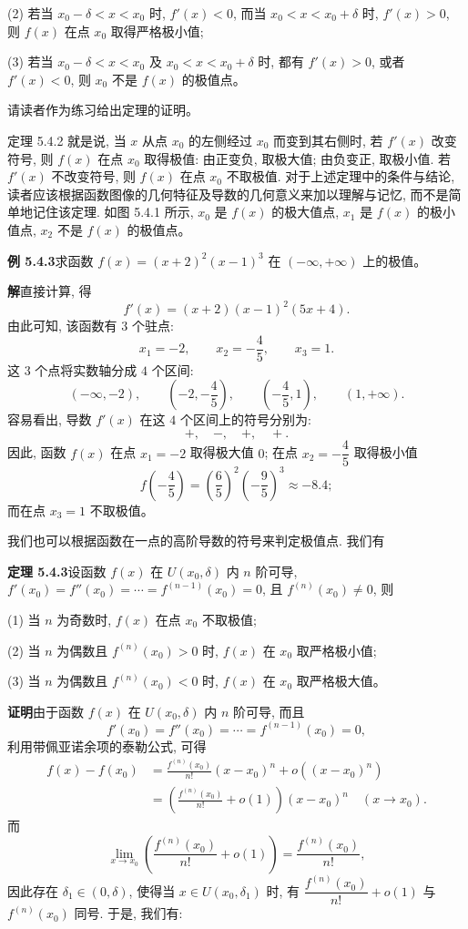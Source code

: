 \documentclass[UTF8, 12pt, fontset=fandol, oneside]{ctexart}
\begin{document}
(2) 若当 $x_0-\delta<x<x_0$ 时, $f'(x)<0$, 而当 $x_0<x<x_0+\delta$ 时, $f'(x)>0$, 则 $f(x)$ 在点 $x_0$ 取得严格极小值;

(3) 若当 $x_0-\delta<x<x_0$ 及 $x_0<x<x_0+\delta$ 时, 都有 $f'(x)>0$, 或者 $f'(x)<0$, 则 $x_0$ 不是 $f(x)$ 的极值点。

请读者作为练习给出定理的证明。

定理 5.4.2 就是说, 当 $x$ 从点 $x_0$ 的左侧经过 $x_0$ 而变到其右侧时, 若 $f'(x)$ 改变符号, 则 $f(x)$ 在点 $x_0$ 取得极值: 由正变负, 取极大值; 由负变正, 取极小值. 若 $f'(x)$ 不改变符号, 则 $f(x)$ 在点 $x_0$ 不取极值. 对于上述定理中的条件与结论, 读者应该根据函数图像的几何特征及导数的几何意义来加以理解与记忆, 而不是简单地记住该定理. 如图 5.4.1 所示, $x_0$ 是 $f(x)$ 的极大值点, $x_1$ 是 $f(x)$ 的极小值点, $x_2$ 不是 $f(x)$ 的极值点。

\noindent\textbf{例 5.4.3}\quad 求函数 $f(x)=(x+2)^2(x-1)^3$ 在 $(-\infty,+\infty)$ 上的极值。

\noindent\textbf{解}\quad 直接计算, 得
\[
  f'(x)=(x+2)(x-1)^2(5x+4).
\]
由此可知, 该函数有 $3$ 个驻点:
\[
  x_1=-2,\qquad x_2=-\frac45,\qquad x_3=1.
\]
这 $3$ 个点将实数轴分成 $4$ 个区间:
\[
  (-\infty,-2),\qquad \left(-2,-\frac45\right),\qquad
  \left(-\frac45,1\right),\qquad (1,+\infty).
\]
容易看出, 导数 $f'(x)$ 在这 $4$ 个区间上的符号分别为:
\[
  +,\quad -,\quad +,\quad +.
\]
因此, 函数 $f(x)$ 在点 $x_1=-2$ 取得极大值 $0$; 在点 $x_2=-\dfrac45$ 取得极小值
\[
  f\left(-\frac45\right)=\left(\frac65\right)^2\left(-\frac95\right)^3\approx -8.4;
\]
而在点 $x_3=1$ 不取极值。

我们也可以根据函数在一点的高阶导数的符号来判定极值点. 我们有

\noindent\textbf{定理 5.4.3}\quad 设函数 $f(x)$ 在 $U(x_0,\delta)$ 内 $n$ 阶可导, $f'(x_0)=f''(x_0)=\cdots=f^{(n-1)}(x_0)=0$, 且 $f^{(n)}(x_0)\ne0$, 则

(1) 当 $n$ 为奇数时, $f(x)$ 在点 $x_0$ 不取极值;

(2) 当 $n$ 为偶数且 $f^{(n)}(x_0)>0$ 时, $f(x)$ 在 $x_0$ 取严格极小值;

(3) 当 $n$ 为偶数且 $f^{(n)}(x_0)<0$ 时, $f(x)$ 在 $x_0$ 取严格极大值。

\noindent\textbf{证明}\quad 由于函数 $f(x)$ 在 $U(x_0,\delta)$ 内 $n$ 阶可导, 而且
\[
  f'(x_0)=f''(x_0)=\cdots=f^{(n-1)}(x_0)=0,
\]
利用带佩亚诺余项的泰勒公式, 可得
\begin{equation}
\begin{aligned}
  f(x)-f(x_0)
  &=\frac{f^{(n)}(x_0)}{n!}(x-x_0)^n+o((x-x_0)^n)\\
  &=\left(\frac{f^{(n)}(x_0)}{n!}+o(1)\right)(x-x_0)^n\quad (x\to x_0).
\end{aligned}
\tag{5.4.1}
\end{equation}
而
\[
  \lim_{x\to x_0}\left(\frac{f^{(n)}(x_0)}{n!}+o(1)\right)
  =\frac{f^{(n)}(x_0)}{n!},
\]
因此存在 $\delta_1\in(0,\delta)$, 使得当 $x\in U(x_0,\delta_1)$ 时, 有 $\dfrac{f^{(n)}(x_0)}{n!}+o(1)$ 与 $f^{(n)}(x_0)$ 同号. 于是, 我们有:
\end{document}
